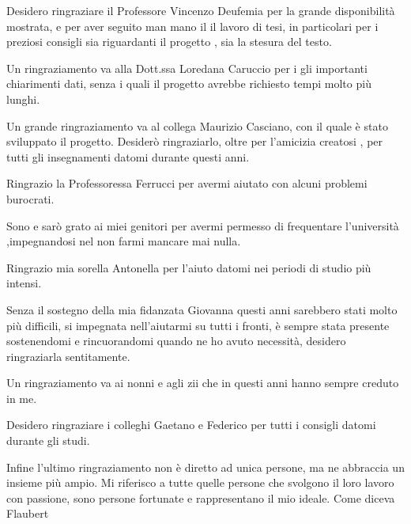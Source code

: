 Desidero ringraziare il Professore Vincenzo Deufemia per la grande disponibilità mostrata, e per aver seguito man mano il il lavoro di tesi, in particolari per i preziosi consigli sia riguardanti il progetto , sia la stesura del testo. 

Un ringraziamento va alla Dott.ssa Loredana Caruccio per i gli importanti chiarimenti dati, senza i quali il progetto avrebbe richiesto tempi molto più lunghi.

Un grande ringraziamento va al collega Maurizio Casciano, con il quale è stato sviluppato il progetto. Desiderò  ringraziarlo, oltre per l'amicizia creatosi , per tutti gli insegnamenti datomi durante questi anni.

Ringrazio la Professoressa Ferrucci per avermi aiutato con alcuni problemi burocrati.

Sono e sarò grato ai miei genitori per avermi permesso di frequentare l'università ,impegnandosi nel non farmi mancare mai nulla.

Ringrazio mia sorella Antonella per l'aiuto datomi nei periodi di studio più intensi.

Senza il sostegno della mia fidanzata Giovanna questi anni sarebbero stati molto più difficili, si impegnata nell'aiutarmi su tutti i fronti, è sempre stata presente sostenendomi e rincuorandomi quando ne ho avuto necessità, desidero ringraziarla sentitamente.

Un ringraziamento va ai nonni e agli zii che in questi anni hanno sempre creduto in me.

Desidero ringraziare i colleghi Gaetano e Federico per tutti i consigli datomi durante gli studi.

Infine l'ultimo ringraziamento non è diretto ad unica persone, ma ne abbraccia un insieme più ampio. Mi riferisco a tutte quelle persone che svolgono il loro lavoro con passione, sono persone fortunate e rappresentano il mio ideale. Come diceva Flaubert 




